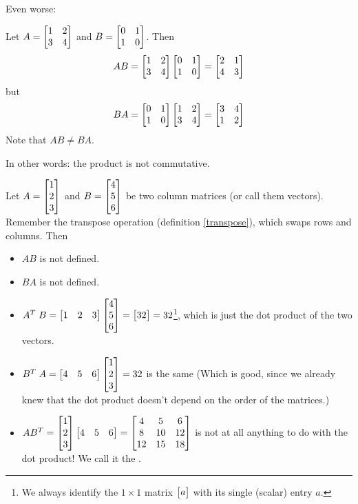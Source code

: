 
Even worse:

\begin{myexample}
Let $A = \mat{1 & 2 \\ 3& 4}$ and $B = \mat{0&1\\1&0}$.
Then
$$
AB = \mat{1 & 2 \\ 3& 4}\mat{0&1\\1&0}=\mat{2&1\\ 4&3}
$$
but 
$$
BA = \mat{0&1\\1&0}\mat{1 & 2 \\ 3& 4}=\mat{3&4\\1&2}
$$
Note that $AB\neq BA$.
\end{myexample}


In other words: the product is not commutative.


\begin{myexample}
Let $A = \mat{1 \\2 \\3}$ and $B = \mat{4\\5\\6}$ be two column matrices
(or call them vectors).  Remember the transpose operation (definition \ref{transpose}), which swaps
rows and columns.  Then 
\begin{itemize}
\item $AB$ is not defined.
\item $BA$ is not defined.
\item $A^T \; B = \mat{1&2&3}\mat{4\\5\\6} = \mat{32} = 32$\footnote{We always identify the $1\times 1$ matrix $\mat{a}$ with its single (scalar) entry $a$.}, which is just the dot product of the
two vectors.
\item $B^T \; A = \mat{4&5&6}\mat{1 \\2 \\3} = 32$ is the same (Which is good, 
since we already knew that the
dot product doesn't depend on the order of the matrices.)
\item $AB^T = \mat{1 \\2 \\3}\mat{4&5&6} = \mat{4 & 5 & 6\\ 8 & 10 & 12\\ 12 & 15 & 18}$ is not at all anything to do with the dot product!  We call it the .
\end{itemize}
\end{myexample}


